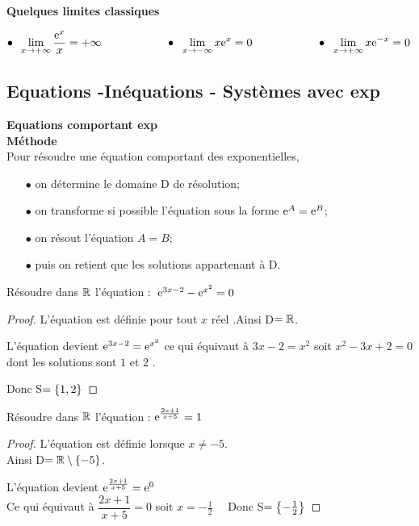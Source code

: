 \textbf{Quelques limites classiques}

\begin{property}
$ \bullet \; \;\displaystyle \lim_{x \to +\infty}\dfrac{\mathrm{e}^{x}}{x}=+\infty \hspace*{2cm}
 \bullet \; \; \displaystyle\lim_{x \to -\infty}x\mathrm{e}^{x}=0  \hspace*{2cm}
 \bullet \;\; \lim_{x \to +\infty} x\mathrm{e}^{-x}=0$

\end{property}

\subsection{Equations -Inéquations - Systèmes avec  exp}
\textbf{Equations comportant exp}\\
\textbf{Méthode}\\
Pour résoudre une équation comportant des exponentielles,
\begin{itemize}
\item[$ \bullet$] on détermine le domaine D de résolution;
\item[$ \bullet$] on transforme si possible l'équation sous la forme $ \mathrm{e}^{A}=\mathrm{e}^{B} $;
\item[$ \bullet$] on résout l'équation $ A=B $;
\item[$ \bullet$]  puis on retient que les solutions appartenant à D.
\end{itemize}

\begin{example} Résoudre dans $ \mathbb{R} $ l'équation : $\; \mathrm{e}^{3x-2}-\mathrm{e}^{x^{2}}=0 $
\end{example}
\begin{proof}
L'équation est définie pour tout $ x $ réel .\quad Ainsi D$ =\mathbb{R} $.

L'équation devient  $ \mathrm{e}^{3x-2}=\mathrm{e}^{x^{2}}$  ce qui équivaut à $ 3x-2=x^{2} $  soit $x^{2}-3x+2=0$  dont les  solutions  sont $ 1$ et $ 2$ .

  Donc S$ =\left\{1,2\right\} $
\end{proof}
\begin{example} Résoudre dans $ \mathbb{R} $ l'équation :\; $\mathrm{e}^{\frac{2x+1}{x+5}} =1  $
\end{example}
\begin{proof}
L'équation est définie lorsque $x\neq-5$.\\  \quad Ainsi D$ =\mathbb{R}\setminus\left\{-5\right\} $.

L'équation devient  $ \mathrm{e}^{\frac{2x+1}{x+5}} =\mathrm{e}^{0}$ \\Ce qui équivaut à $\dfrac{2x+1}{x+5} =0 $  soit $ x=-\frac{1}{2} \quad$  
 Donc S$ =\left\{-\frac{1}{2}\right\} $
\end{proof}

